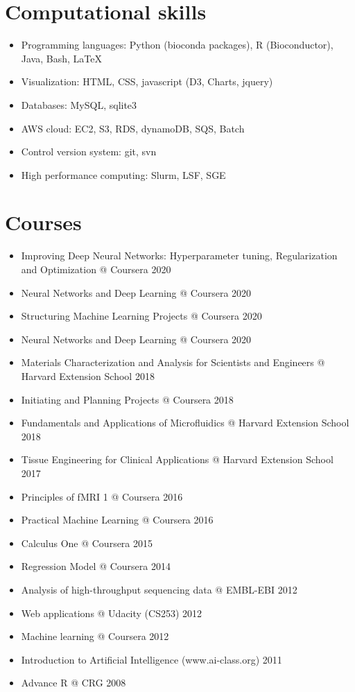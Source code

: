 \hypertarget{skills}{%
\section{Computational skills}\label{skills}}
\begin{itemize}
\tightlist
  \item Programming languages: Python (bioconda packages), R (Bioconductor), Java, Bash, LaTeX
  \item Visualization: HTML, CSS, javascript (D3, Charts, jquery)
  \item Databases: MySQL, sqlite3
  \item AWS cloud: EC2, S3, RDS, dynamoDB, SQS, Batch
  \item Control version system: git, svn
  \item High performance computing: Slurm, LSF, SGE
\end{itemize}

\hypertarget{courses}{%
\section{Courses}\label{courses}}

\begin{itemize}
\tightlist
\item Improving Deep Neural Networks: Hyperparameter tuning, Regularization and Optimization @ Coursera 2020
\item Neural Networks and Deep Learning @ Coursera 2020
\item Structuring Machine Learning Projects @ Coursera 2020
\item Neural Networks and Deep Learning @ Coursera 2020
\item Materials Characterization and Analysis for Scientists and Engineers @ Harvard Extension
School 2018
\item Initiating and Planning Projects @ Coursera 2018
\item
  Fundamentals and Applications of Microfluidics @ Harvard Extension
  School 2018
\item
  Tissue Engineering for Clinical Applications @ Harvard Extension
  School 2017
\item
  Principles of fMRI 1 @ Coursera 2016
\item
  Practical Machine Learning @ Coursera 2016
\item
  Calculus One @ Coursera 2015
\item
  Regression Model @ Coursera 2014
\item
  Analysis of high-throughput sequencing data @ EMBL-EBI 2012
\item
  Web applications @ Udacity (CS253) 2012
\item
  Machine learning @ Coursera 2012
\item
  Introduction to Artificial Intelligence (www.ai-class.org) 2011
\item
  Advance R @ CRG 2008
\end{itemize}
